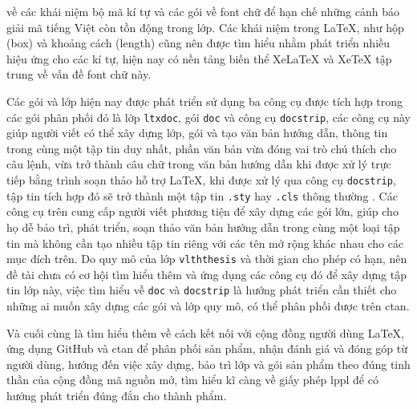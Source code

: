 về các khái niệm bộ mã kí tự và các gói về font chữ để hạn chế những cảnh báo giải mã tiếng Việt còn tồn động trong
lớp. Các khái niệm trong LaTeX, như hộp (box) và khoảng cách (length) cũng nên được tìm hiểu nhằm phát triển nhiều hiệu
ứng cho các kí tự, hiện nay có nền tảng biến thể XeLaTeX và XeTeX tập trung về vấn đề font chữ này.\par
Các gói và lớp hiện nay được phát triển sử dụng ba công cụ được tích hợp trong các gói phân phối đó là lớp \texttt{ltxdoc},
gói \texttt{doc} và công cụ \texttt{docstrip}, các công cụ này giúp người viết có thể xây dựng lớp, gói và tạo văn bản
hướng dẫn, thông tin trong cùng một tập tin duy nhất, phần văn bản vừa đóng vai trò chú thích cho câu lệnh, vừa trở thành câu chữ trong văn
bản hướng dẫn khi được xử lý trực tiếp bằng trình soạn thảo hỗ trợ LaTeX, khi được xử lý qua công cụ \texttt{docstrip}, tập tin tích hợp
đó sẽ trở thành một tập tin \texttt{.sty} hay \texttt{.cls} thông thường \cite{latex-comp}. Các công cụ trên cung cấp người viết phương tiện để xây dựng
các gói lớn, giúp cho họ dễ bảo trì, phát triển, soạn thảo văn bản hướng dẫn trong cùng một loại tập tin mà không cần tạo nhiều
tập tin riêng với các tên mở rộng khác nhau cho các mục đích trên. Do quy mô của lớp \texttt{vlththesis} và thời gian cho phép có hạn, nên đề tài chưa có cơ hội tìm
hiểu thêm và ứng dụng các công cụ đó để xây dựng tập tin lớp này, việc tìm hiểu về \texttt{doc} và \texttt{docstrip} là hướng phát
triển cần thiết cho những ai muốn xây dựng các gói và lớp quy mô, có thể phân phối được trên \acrshort{ctan}.\par
Và cuối cùng là tìm hiểu thêm về cách kết nối với cộng đồng người dùng LaTeX, ứng dụng GitHub và \acrshort{ctan} để phân phối
sản phẩm, nhận đánh giá và đóng góp từ người dùng, hướng đến việc xây dựng, bảo trì lớp và gói sản phẩm theo đúng tinh thần của cộng đồng mã nguồn mở, tìm hiểu kĩ
càng về giấy phép \acrshort{lppl} để có hướng phát triển đúng đắn cho thành phẩm.\par 
